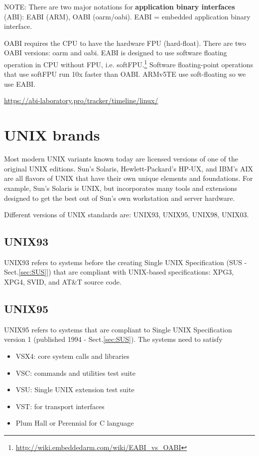 NOTE: There are two major notations for {\bf application binary interfaces}
(ABI): EABI (ARM), OABI (oarm/oabi). EABI = embedded application binary
interface.

OABI requires the CPU to have the hardware FPU (hard-float). There are two OABI
versions: oarm and oabi. EABI is designed to use software floating operation in
CPU without FPU, i.e.
softFPU.\footnote{\url{http://wiki.embeddedarm.com/wiki/EABI_vs_OABI}} Software
floating-point operations that use softFPU run 10x faster than OABI.
ARMv5TE use soft-floating so we use EABI.



\url{https://abi-laboratory.pro/tracker/timeline/linux/}

\section{UNIX brands}
\label{sec:UNIX_standards}

Most modern UNIX variants known today are licensed versions of one of the
original UNIX editions. Sun's Solaris, Hewlett-Packard's HP-UX, and IBM's AIX
are all flavors of UNIX that have their own unique elements and foundations.
For example, Sun's Solaris is UNIX, but incorporates many tools and extensions
designed to get the best out of Sun's own workstation and server hardware.

Different versions of UNIX standards are: UNIX93, UNIX95, UNIX98, UNIX03. 

\subsection{UNIX93}
\label{sec:UNIX93}


UNIX93 refers to systems before the creating Single UNIX Specification (SUS -
Sect.\ref{sec:SUS}]) that are compliant with UNIX-based specifications: XPG3,
XPG4, SVID, and AT\&T source code.

\subsection{UNIX95}
\label{sec:UNIX95}

UNIX95 refers to systems that are compliant to Single UNIX Specification version
1 (published 1994 - Sect.\ref{sec:SUS}). The systems need to satisfy
\begin{itemize}
  \item VSX4: core system calls and libraries
  \item VSC: commands and utilities test suite
  \item VSU: Single UNIX extension test suite
  \item VST: for transport interfaces
  \item Plum Hall or Perennial for C language
\end{itemize}

